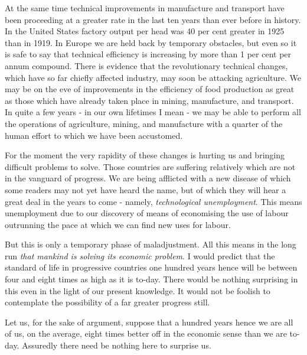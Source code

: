 At the same time technical improvements in manufacture and transport have been proceeding at a greater rate in the last ten years than ever before in history. In the United States factory output per head was 40 per cent greater in 1925 than in 1919. In Europe we are held back by temporary obstacles, but even so it is safe to say that technical efficiency is increasing by more than 1 per cent per annum compound. There is evidence that the revolutionary technical changes, which have so far chiefly affected industry, may soon be attacking agriculture. We may be on the eve of improvements in the efficiency of food production as great as those which have already taken place in mining, manufacture, and transport. In quite a few years - in our own lifetimes I mean - we may be able to perform all the operations of agriculture, mining, and manufacture with a quarter of the human effort to which we have been accustomed.\par

For the moment the very rapidity of these changes is hurting us and bringing difficult problems to solve. Those countries are suffering relatively which are not in the vanguard of progress. We are being afflicted with a new disease of which some readers may not yet have heard the name, but of which they will hear a great deal in the years to come - namely, \textit{technological unemployment}. This means unemployment due to our discovery of means of economising the use of labour outrunning the pace at which we can find new uses for labour.\par

But this is only a temporary phase of maladjustment. All this means in the long run \textit{that mankind is solving its economic problem}. I would predict that the standard of life in progressive countries one hundred years hence will be between four and eight times as high as it is to-day. There would be nothing surprising in this even in the light of our present knowledge. It would not be foolish to contemplate the possibility of a far greater progress still.\par


Let us, for the sake of argument, suppose that a hundred years hence we are all of us, on the average, eight times better off in the economic sense than we are to-day. Assuredly there need be nothing here to surprise us.\par

